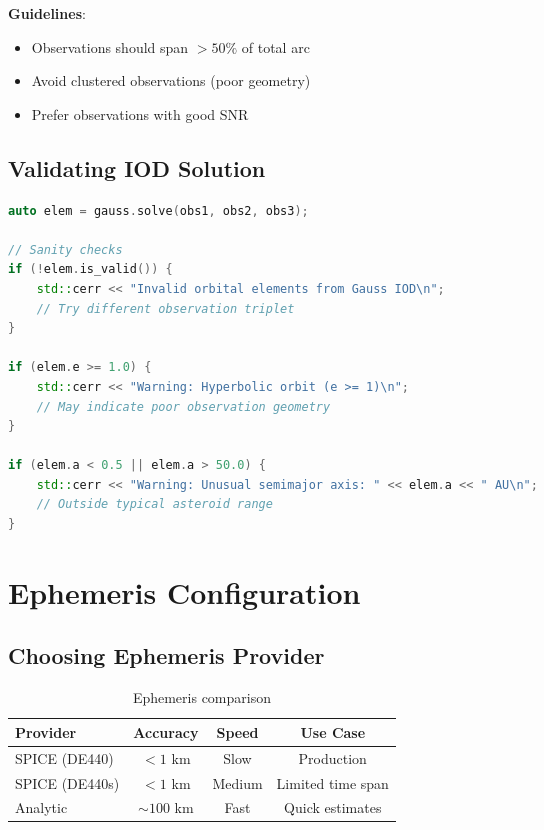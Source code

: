 \textbf{Guidelines}:
\begin{itemize}
    \item Observations should span $> 50\%$ of total arc
    \item Avoid clustered observations (poor geometry)
    \item Prefer observations with good SNR
\end{itemize}

\subsection{Validating IOD Solution}

\begin{lstlisting}[language=C++]
auto elem = gauss.solve(obs1, obs2, obs3);

// Sanity checks
if (!elem.is_valid()) {
    std::cerr << "Invalid orbital elements from Gauss IOD\n";
    // Try different observation triplet
}

if (elem.e >= 1.0) {
    std::cerr << "Warning: Hyperbolic orbit (e >= 1)\n";
    // May indicate poor observation geometry
}

if (elem.a < 0.5 || elem.a > 50.0) {
    std::cerr << "Warning: Unusual semimajor axis: " << elem.a << " AU\n";
    // Outside typical asteroid range
}
\end{lstlisting}

\section{Ephemeris Configuration}

\subsection{Choosing Ephemeris Provider}

\begin{table}[h]
\centering
\caption{Ephemeris comparison}
\begin{tabular}{lccc}
\hline
\textbf{Provider} & \textbf{Accuracy} & \textbf{Speed} & \textbf{Use Case} \\
\hline
SPICE (DE440) & $< 1$ km & Slow & Production \\
SPICE (DE440s) & $< 1$ km & Medium & Limited time span \\
Analytic & $\sim 100$ km & Fast & Quick estimates \\
\hline
\end{tabular}
\end{table}

